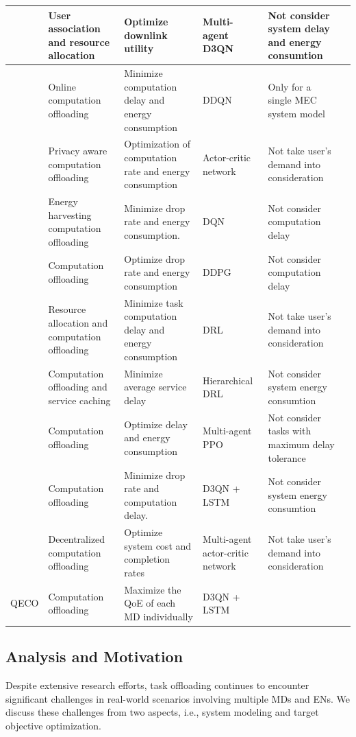 \documentclass[10pt, journal,letterpaper]{IEEEtran}
\begin{document}
\begin{table}[htbp]
{{\begin{tabular}{ lp{4cm}p{4.6cm}p{2cm}p{4.7cm}l}
 				\cite{zhao2019deep} & User association and resource allocation & Optimize downlink utility  & Multi-agent D3QN & Not consider system delay and energy consumtion \\\midrule
 				\cite{liao2023online}  & Online computation offloading & Minimize computation delay and energy consumption & DDQN & Only for a single MEC system model  \\\midrule
 				\cite{wu2024combining}   & Privacy aware computation offloading & Optimization of computation rate and energy consumption  & Actor-critic network  & Not take user's demand into consideration \\\midrule
 				\cite{Bolourian-WCL24}  & Energy harvesting  computation offloading & Minimize drop rate and energy consumption.  & DQN & Not consider computation delay  \\\midrule
 				\cite{huang2021deadline}  & Computation offloading & Optimize drop rate and energy consumption & DDPG & Not consider computation delay \\ \midrule
 				\cite{gong2022edge} & Resource allocation and computation offloading & Minimize task computation delay and energy consumption  & DRL & Not take user's demand into consideration\\\midrule
 				\cite{sun2024hierarchical} & Computation offloading and service caching & Minimize average service delay & Hierarchical DRL & Not consider system energy consumtion \\\midrule
 				\cite{wu2023multi}  & Computation offloading & Optimize delay and energy consumption  & Multi-agent PPO&  Not consider tasks with maximum delay tolerance \\\midrule
 				\cite{9253665}  &  Computation offloading & Minimize drop rate and computation delay.  & D3QN + LSTM & Not consider system energy consumtion\\\midrule
 				\cite{gao2022large}  & Decentralized computation offloading & Optimize system cost and completion rates  & Multi-agent actor-critic network& Not take user's demand into consideration \\\midrule
 				QECO  &  Computation offloading & Maximize the QoE of each MD individually & D3QN + LSTM & \\
 				\toprule
 		\end{tabular}}
 		\label{table1}}
 \end{table}
\subsection{Analysis and Motivation}
Despite extensive research efforts, task offloading continues to encounter significant challenges in real-world scenarios involving multiple MDs and ENs. We discuss these challenges from two aspects, i.e., system modeling and target objective optimization.
 
\end{document}
